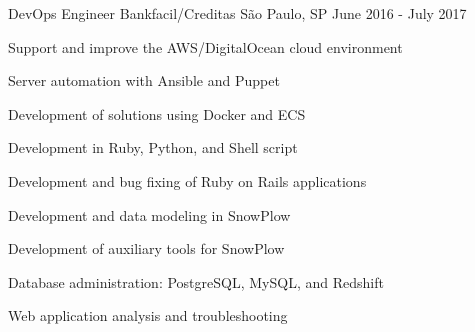 \begin{cventries}
\cventry
{DevOps Engineer} %
{Bankfacil/Creditas} %
{São Paulo, SP} %
{June 2016 - July 2017} %
{
  \begin{cvitems} %
    \item {Support and improve the AWS/DigitalOcean cloud environment}
    \item {Server automation with Ansible and Puppet}
    \item {Development of solutions using Docker and ECS}
    \item {Development in Ruby, Python, and Shell script}
    \item {Development and bug fixing of Ruby on Rails applications}
    \item {Development and data modeling in SnowPlow}
    \item {Development of auxiliary tools for SnowPlow}
    \item {Database administration: PostgreSQL, MySQL, and Redshift}
    \item {Web application analysis and troubleshooting}
  \end{cvitems}
}


\end{cventries}
